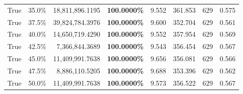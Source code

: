 \begin{table}[H]
\begin{tabular}{|m{} | m{} | r | R{0.13\textwidth} | R{0.09\textwidth} | R{0.09\textwidth} | R{0.09\textwidth} | R{0.11\textwidth} |}
True & 35.0\% & 18,811,896.1195 & \bfseries \color{red} 100.0000\% & 9.552 & 361.853 & 629 & 0.575 \\
True & 37.5\% & 39,824,784.3976 & \bfseries \color{red} 100.0000\% & 9.600 & 352.704 & 629 & 0.561 \\
True & 40.0\% & 14,650,719.4290 & \bfseries \color{red} 100.0000\% & 9.552 & 357.954 & 629 & 0.569 \\
True & 42.5\% & 7,366,844.3689 & \bfseries \color{red} 100.0000\% & 9.543 & 356.454 & 629 & 0.567 \\
True & 45.0\% & 11,409,991.7638 & \bfseries \color{red} 100.0000\% & 9.656 & 356.081 & 629 & 0.566 \\
True & 47.5\% & 8,886,110.5205 & \bfseries \color{red} 100.0000\% & 9.688 & 353.396 & 629 & 0.562 \\
True & 50.0\% & 11,409,991.7638 & \bfseries \color{red} 100.0000\% & 9.573 & 356.522 & 629 & 0.567 \\
\bottomrule
\end{tabular}
\end{table}
